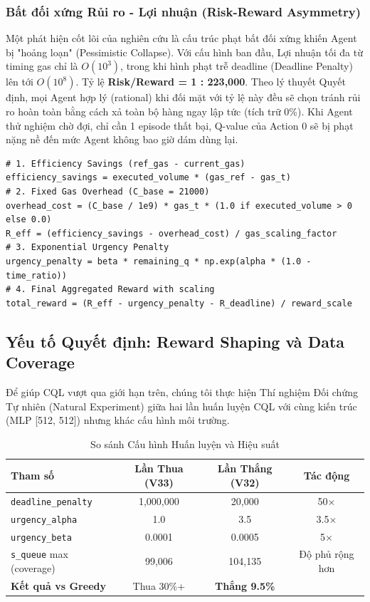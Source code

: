 \subsubsection{Bất đối xứng Rủi ro - Lợi nhuận (Risk-Reward Asymmetry)}
Một phát hiện cốt lõi của nghiên cứu là cấu trúc phạt bất đối xứng khiến Agent bị "hoảng loạn" (Pessimistic Collapse).
Với cấu hình ban đầu, Lợi nhuận tối đa từ timing gas chỉ là $O(10^3)$, trong khi hình phạt trễ deadline (Deadline Penalty) lên tới $O(10^8)$.
Tỷ lệ \textbf{Risk/Reward = 1 : 223,000}.
Theo lý thuyết Quyết định, mọi Agent hợp lý (rational) khi đối mặt với tỷ lệ này đều sẽ chọn tránh rủi ro hoàn toàn bằng cách xả toàn bộ hàng ngay lập tức (tích trữ 0\%). Khi Agent thử nghiệm chờ đợi, chỉ cần 1 episode thất bại, Q-value của Action 0 sẽ bị phạt nặng nề đến mức Agent không bao giờ dám dùng lại.

\begin{lstlisting}[style=PythonStyle, caption={Algebraic Mirror Reward Implementation (Source: enviroment.py)}]
# 1. Efficiency Savings (ref_gas - current_gas)
efficiency_savings = executed_volume * (gas_ref - gas_t)
# 2. Fixed Gas Overhead (C_base = 21000)
overhead_cost = (C_base / 1e9) * gas_t * (1.0 if executed_volume > 0 else 0.0)
R_eff = (efficiency_savings - overhead_cost) / gas_scaling_factor
# 3. Exponential Urgency Penalty
urgency_penalty = beta * remaining_q * np.exp(alpha * (1.0 - time_ratio))
# 4. Final Aggregated Reward with scaling
total_reward = (R_eff - urgency_penalty - R_deadline) / reward_scale
\end{lstlisting}

\subsection{Yếu tố Quyết định: Reward Shaping và Data Coverage}

Để giúp CQL vượt qua giới hạn trên, chúng tôi thực hiện Thí nghiệm Đối chứng Tự nhiên (Natural Experiment) giữa hai lần huấn luyện CQL với cùng kiến trúc (MLP [512, 512]) nhưng khác cấu hình môi trường.

\begin{table}[H]
\centering
\caption{So sánh Cấu hình Huấn luyện và Hiệu suất}
\label{tab:reward_shaping}
\begin{tabular}{lccc}
\hline
\textbf{Tham số} & \textbf{Lần Thua (V33)} & \textbf{Lần Thắng (V32)} & \textbf{Tác động} \\
\hline
\texttt{deadline\_penalty} & 1,000,000 & 20,000 & 50$\times$ \\
\texttt{urgency\_alpha} & 1.0 & 3.5 & 3.5$\times$ \\
\texttt{urgency\_beta} & 0.0001 & 0.0005 & 5$\times$ \\
\texttt{s\_queue} max (coverage) & 99,006 & 104,135 & Độ phủ rộng hơn \\
\hline
\textbf{Kết quả vs Greedy} & Thua 30\%+ & \textbf{Thắng 9.5\%} & \\
\hline
\end{tabular}
\end{table}

